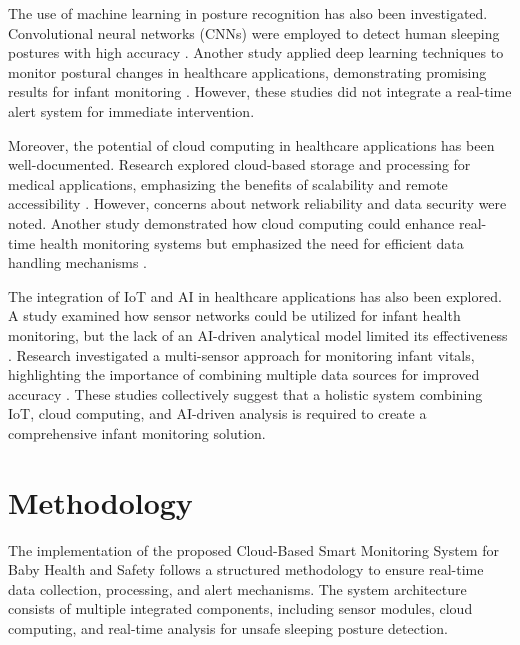 \documentclass[conference]{IEEEtran}
\begin{document}
The use of machine learning in posture recognition has also been investigated. Convolutional neural networks (CNNs) were employed to detect human sleeping postures with high accuracy \cite{ref4}. Another study applied deep learning techniques to monitor postural changes in healthcare applications, demonstrating promising results for infant monitoring \cite{ref5}. However, these studies did not integrate a real-time alert system for immediate intervention.  

Moreover, the potential of cloud computing in healthcare applications has been well-documented. Research explored cloud-based storage and processing for medical applications, emphasizing the benefits of scalability and remote accessibility \cite{ref6}. However, concerns about network reliability and data security were noted. Another study demonstrated how cloud computing could enhance real-time health monitoring systems but emphasized the need for efficient data handling mechanisms \cite{ref7}.  

The integration of IoT and AI in healthcare applications has also been explored. A study examined how sensor networks could be utilized for infant health monitoring, but the lack of an AI-driven analytical model limited its effectiveness \cite{ref8}. Research investigated a multi-sensor approach for monitoring infant vitals, highlighting the importance of combining multiple data sources for improved accuracy \cite{ref9}. These studies collectively suggest that a holistic system combining IoT, cloud computing, and AI-driven analysis is required to create a comprehensive infant monitoring solution.  

\section{Methodology}
The implementation of the proposed Cloud-Based Smart Monitoring System for Baby Health and Safety follows a structured methodology to ensure real-time data collection, processing, and alert mechanisms. The system architecture consists of multiple integrated components, including sensor modules, cloud computing, and real-time analysis for unsafe sleeping posture detection.
\end{document}
